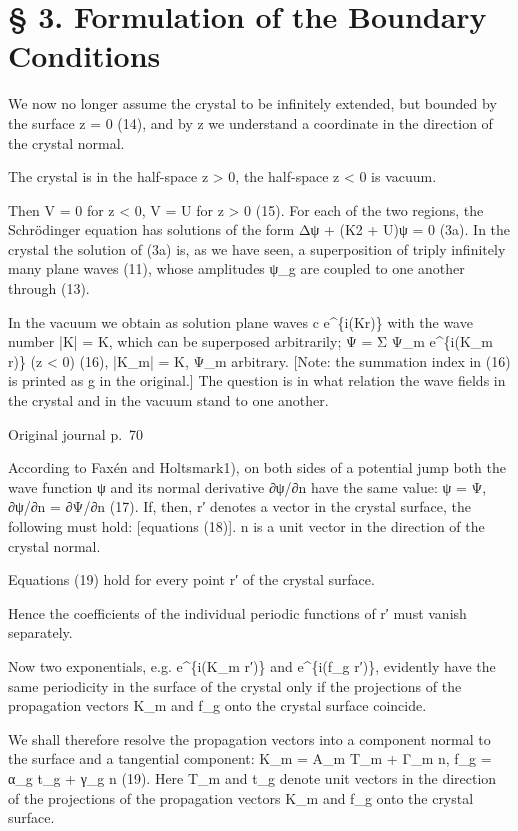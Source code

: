\documentclass[10pt]{article}
\newcommand{\origpage}[1]{\par\medskip\noindent\hfill{\small\color{notegray}Original journal p.~#1}\hfill\mbox{}\par\smallskip}
\begin{document}
\section*{§ 3. Formulation of the Boundary Conditions}
We now no longer assume the crystal to be infinitely extended, but bounded by the surface z = 0 (14), and by z we understand a coordinate in the direction of the crystal normal.\par
The crystal is in the half-space z > 0, the half-space z < 0 is vacuum.\par
Then V = 0 for z < 0, V = U for z > 0 (15). For each of the two regions, the Schrödinger equation has solutions of the form Δψ + (K2 + U)ψ = 0 (3a). In the crystal the solution of (3a) is, as we have seen, a superposition of triply infinitely many plane waves (11), whose amplitudes ψ\_g are coupled to one another through (13).\par
In the vacuum we obtain as solution plane waves c e\textasciicircum{}\{i(Kr)\} with the wave number |K| = K, which can be superposed arbitrarily; Ψ = Σ Ψ\_m e\textasciicircum{}\{i(K\_m r)\} (z < 0) (16), |K\_m| = K, Ψ\_m arbitrary. [Note: the summation index in (16) is printed as g in the original.] The question is in what relation the wave fields in the crystal and in the vacuum stand to one another.\par
\origpage{70}
According to Faxén and Holtsmark1), on both sides of a potential jump both the wave function ψ and its normal derivative ∂ψ/∂n have the same value: ψ = Ψ, ∂ψ/∂n = ∂Ψ/∂n (17). If, then, r′ denotes a vector in the crystal surface, the following must hold: [equations (18)]. n is a unit vector in the direction of the crystal normal.\par
Equations (19) hold for every point r′ of the crystal surface.\par
Hence the coefficients of the individual periodic functions of r′ must vanish separately.\par
Now two exponentials, e.g. e\textasciicircum{}\{i(K\_m r′)\} and e\textasciicircum{}\{i(f\_g r′)\}, evidently have the same periodicity in the surface of the crystal only if the projections of the propagation vectors K\_m and f\_g onto the crystal surface coincide.\par
We shall therefore resolve the propagation vectors into a component normal to the surface and a tangential component: K\_m = A\_m T\_m + Γ\_m n, f\_g = α\_g t\_g + γ\_g n (19). Here T\_m and t\_g denote unit vectors in the direction of the projections of the propagation vectors K\_m and f\_g onto the crystal surface.\par
\end{document}

